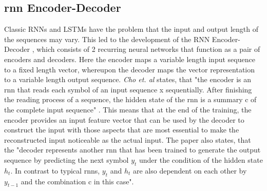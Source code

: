 \documentclass[a4paper, 11pt,titlepage,oneside,openany]{book}
\begin{document}
\subsection{\gls{rnn} Encoder-Decoder}
Classic RNNs and LSTMs have the problem that the input and output length of the sequences may vary. This led to the development of the RNN Encoder-Decoder \cite{encodedecode}, which consists of 2 recurring neural networks that function as a pair of encoders and decoders. Here the encoder maps a variable length input sequence to a fixed length vector, whereupon the decoder maps the vector representation to a variable length output sequence. \textit{Cho et. al} states, that "the encoder is an \gls{rnn} that reads each symbol of an input sequence x sequentially. After finishing the reading process of a sequence, the hidden state of the \gls{rnn} is a summary c of the complete input sequence" \cite{encodedecode}. This means that at the end of the training, the encoder provides an input feature vector that can be used by the decoder to construct the input with those aspects that are most essential to make the reconstructed input noticeable as the actual input. The paper also states, that the "decoder represents another \gls{rnn} that has been trained to generate the output sequence by predicting the next symbol $y_t$ under the condition of the hidden state $h_t$. In contrast to typical \gls{rnn}s, $y_t$ and $h_t$ are also dependent on each other by $y_{t-1}$ and the combination c in this case".
\end{document}
